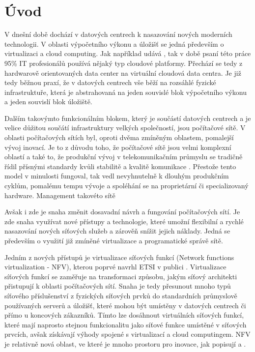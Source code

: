 
\chapter{Úvod}

V dnešní době dochází v datových centrech k nasazování nových moderních technologii. V oblasti výpočetního výkonu a úložišť se jedná především o virtualizaci a cloud computing. Jak například udává \cite{Cloud_adoption} , tak v době psaní této práce 95\% IT profesionálů používá nějaký typ cloudové platformy. Přechází se tedy z hardwarově orientovaných data center na virtuální cloudová data centra. Je již tedy běžnou praxí, že v datových centrech vše běží na rozsáhlé fyzické infrastruktuře, která je abstrahovaná na jeden souvislé blok výpočetního výkonu a jeden souvislí blok úložiště.

Dalším takovýmto funkcionálním blokem, který je součástí datových centrech a je velice důžitou součátí infrastruktury velkých společností, jsou počítačové sítě. V oblasti počítačových sítích byl, oproti dvěma zmíněným oblastem, pomalejší vývoj inovací. Je to z důvodu toho, že počítačové sítě jsou velmi komplexní oblastí a také to, že produkční vývoj v telekomunikačním průmyslu se tradičně řídil přísnými standardy kvůli stabilitě a kvalitě komunikace \cite{telco} . Přestože tento model v minulosti fungoval, tak vedl nevyhnutelně k dlouhým produkčním cyklům, pomalému tempu vývoje a spoléhání se na proprietární či specializovaný hardware. Management takovéto sítě 

Avšak i zde je snaha změnit dosavadní návrh a fungování počítačových sítí. Je zde snaha využívat nové přístupy a technologie, které umožní flexibilní a rychlé nasazování nových síťových služeb a zárověň snížit jejich náklady. Jedná se především o využití již zmíněné virtualizace a programatické správě sítě. \cite{Toward_Unified}

Jedním z nových přístupů je virtualizace síťových funkcí (Network functions virtualization - NFV), kterou poprvé navrhl ETSI v publici \cite{NFV_paper2012} . Virtualizace síťových funkcí se zaměřuje na transformaci způsobu, jakým síťový architekti přistupují k oblasti počítačových sítí. Snaha je tedy přesunout mnoho typů síťového příslušenství z fyzických síťových prvků do standardních průmyslově používaných serverů a úložišť, které mohou být umístěny v datových centrech či přímo u koncových zákazníků. Tímto lze dosáhnout virtuálních síťových funkcí, které mají naprosto stejnou funkcionalitu jako síťové funkce umístěné v síťových prvcích, avšak získávají výhody spojené s virtualizací a cloud computingem. NFV je relativně nová oblast, ve které je mnoho prostoru pro inovace, jak popisují \cite{NFVChalanges} a \cite{NFV_orchestration}. 

